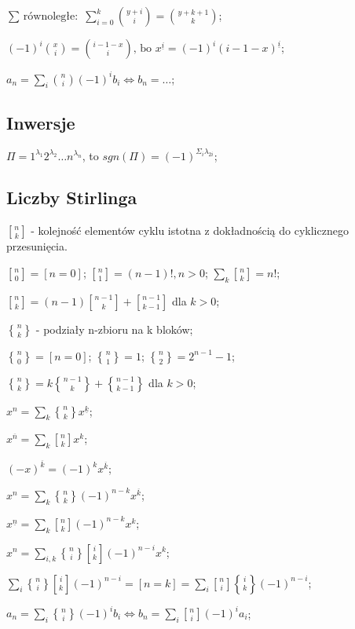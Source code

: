 \documentclass[10pt,a4paper,twocolumn]{article}
\begin{document}
$\text{$\sum$ równoległe: } \sum^k_{i=0} \binom{y + i}{i} =
  \binom{y + k + 1}{k}$;

$(-1)^i\binom{x}{i} = \binom{i - 1 - x}{i} \text{, bo }  x^{\underline{i}} =
  (-1)^i(i - 1 - x)^{\underline{i}}$;

$a_n = \sum_i\binom{n}{i}(-1)^i b_i \iff b_n = \dots$;

\subsection{Inwersje}

$\Pi = 1^{\lambda_1}2^{\lambda_2}\dots n^{\lambda_n}$, to $sgn(\Pi) =
  (-1)^{\Sigma_i\lambda_{2i}}$;

\subsection{Liczby Stirlinga}

${n \brack k}$ - kolejność elementów cyklu istotna z dokładnością do cyklicznego
  przesunięcia.

${n \brack 0} = [ n = 0 ]$;
${n \brack 1} = (n - 1)!, n > 0$;
$\sum_k{n \brack k} = n!$;

${n \brack k} = (n-1){n-1 \brack k}+{n-1 \brack k-1}$ dla ${k > 0}$;

${n \brace k}$ - podziały n-zbioru na k bloków;

${n \brace 0} = [n = 0]$;
${n \brace 1} = 1$;
${n \brace 2} = 2^{n-1}-1$;

${n \brace k} = k{n-1 \brace k} + {n-1 \brace k-1}$ dla ${k > 0}$;

$x^n = \sum_k{n \brace k} x^{\underline{k}}$;

$x^{\overline{n}} = \sum_k{n \brack k}x^k$;

$(-x)^{\overline{k}} = (-1)^kx^{\overline{k}}$;

$x^n = \sum_k {n \brace k} (-1)^{n-k} x^{\overline{k}}$;

$x^{\underline{n}} = \sum_k {n \brack k} (-1)^{n-k} x^{k}$;

$x^n = \sum_{i,k} {n \brace i}{i \brack k}(-1)^{n-i}x^k$;

$\sum_i{n \brace i}{i \brack k}(-1)^{n-i} = [n=k] =
  \sum_i{n \brack i}{i \brace k}(-1)^{n-i}$;

$a_n = \sum_i{n \brace i}(-1)^ib_i \iff b_n = \sum_i{n \brack i}(-1)^ia_i$;

\end{document}
